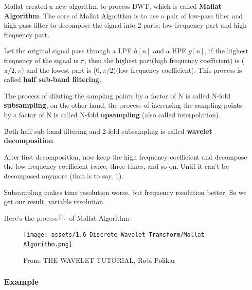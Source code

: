 \documentclass[12pt]{ctexart}
\begin{document}
Mallat created a new algorithm to process DWT, which is called \textbf{Mallat Algorithm}.
The core of Mallat Algorithm is to use a pair of low-pass filter and high-pass filter
to decompose the signal into 2 parts: low frequency part and high frequency part.

Let the original signal pass through a LPF $h[n]$ and a HPF $g[n]$, if the highest
frequency of the signal is $\pi$, then the highest part(high frequency coefficient) is
($\pi/2, \pi$) and the lowest part is ($0, \pi/2$)(low frequency coefficient). This
process is called \textbf{half sub-band filtering}.

The process of diluting the sampling points by a factor of N is called N-fold
\textbf{subsampling}, on the other hand, the process of increasing the sampling points
by a factor of N is called N-fold \textbf{upsampling} (also called interpolation).

Both half sub-band filtering and 2-fold subsampling is called \textbf{wavelet decomposition}.

After first decomposition, now keep the high frequency coefficient and decompose the
low frequency coefficient twice, three times, and so on. Until it can't be
decomposed anymore (that is to say, 1).

Subsampling makes time resolution worse, but frequency resolution better. So we get our
result, variable resolution.

Here's the process$^{[1]}$ of Mallat Algorithm:
\begin{figure}[H]
  \centering
  \texttt{[image: assets/1.6 Discrete Wavelet Transform/Mallat
  Algorithm.png]}
  \caption{From: THE WAVELET TUTORIAL, Robi Polikar}
\end{figure}

\subsubsection{\textbf{Example}}
\end{document}
